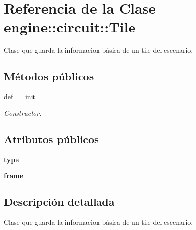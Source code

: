 \hypertarget{classengine_1_1circuit_1_1Tile}{
\section{\-Referencia de la \-Clase engine\-:\-:circuit\-:\-:\-Tile}
\label{classengine_1_1circuit_1_1Tile}
}


\-Clase que guarda la informacion básica de un tile del escenario.  


\subsection*{\-Métodos públicos}
\begin{DoxyCompactItemize}
\item 
def \hyperlink{classengine_1_1circuit_1_1Tile_a869477a6dcc363f6afc1da659a37e921}{\-\_\-\-\_\-init\-\_\-\-\_\-}
\begin{DoxyCompactList}\small\item\em \-Constructor. \end{DoxyCompactList}\end{DoxyCompactItemize}
\subsection*{\-Atributos públicos}
\begin{DoxyCompactItemize}
\item 
\hypertarget{classengine_1_1circuit_1_1Tile_a6e87e64a8f207095ffe8740b2d0d1fbd}{
{\bfseries type}}
\label{classengine_1_1circuit_1_1Tile_a6e87e64a8f207095ffe8740b2d0d1fbd}

\item 
\hypertarget{classengine_1_1circuit_1_1Tile_a61667dee79ece51c83d1d10c47282d2b}{
{\bfseries frame}}
\label{classengine_1_1circuit_1_1Tile_a61667dee79ece51c83d1d10c47282d2b}

\end{DoxyCompactItemize}


\subsection{\-Descripción detallada}
\-Clase que guarda la informacion básica de un tile del escenario. 

